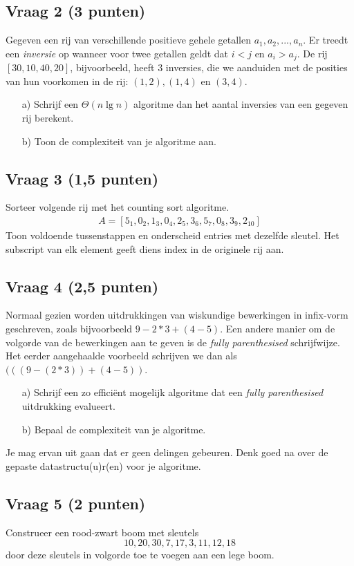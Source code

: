 \documentclass[kulak]{kulakarticle}
\begin{document}
	\subsection*{Vraag 2 (3 punten)}

	Gegeven een rij van verschillende positieve gehele getallen \(a_1, a_2, ..., a_n\). Er treedt een \textit{inversie} op wanneer voor twee getallen geldt dat \(i<j\) en \(a_i>a_j\). De rij \([30,10,40,20]\), bijvoorbeeld, heeft 3 inversies, die we aanduiden met de posities van hun voorkomen in de rij: \((1,2), (1,4)\) en \((3,4)\).

	\begin{itemize}
		\item[a)] Schrijf een \(\Theta(n \lg n)\) algoritme dan het aantal inversies van een gegeven rij berekent.
		\item[b)] Toon de complexiteit van je algoritme aan.
	\end{itemize}

	\subsection*{Vraag 3 (1,5 punten)}

	Sorteer volgende rij met het counting sort algoritme.
	\begin{align*}
		A = [5_1, 0_2, 1_3, 0_4, 2_5, 3_6, 5_7, 0_8, 3_9, 2_{10}]
	\end{align*}
	Toon voldoende tussenstappen en onderscheid entries met dezelfde sleutel. Het subscript van elk element geeft diens index in de originele rij aan.

	\subsection*{Vraag 4 (2,5 punten)}

	Normaal gezien worden uitdrukkingen van wiskundige bewerkingen in infix-vorm geschreven, zoals bijvoorbeeld  \(9-2*3+(4-5)\). Een andere manier om de volgorde van de bewerkingen aan te geven is de \textit{fully parenthesised} schrijfwijze. Het eerder aangehaalde voorbeeld schrijven we dan als \( (((9 - (2*3)) + (4 - 5)) \).

	\begin{enumerate}
		\item[a)] Schrijf een zo efficiënt mogelijk algoritme dat een \textit{fully parenthesised} uitdrukking evalueert.
		\item[b)] Bepaal de complexiteit van je algoritme.
	\end{enumerate}

	Je mag ervan uit gaan dat er geen delingen gebeuren. Denk goed na over de gepaste datastructu(u)r(en) voor je algoritme.

	\subsection*{Vraag 5 (2 punten)}

	Construeer een rood-zwart boom met sleutels \[10, 20, 30, 7, 17, 3, 11, 12, 18\] door deze sleutels in volgorde toe te voegen aan een lege boom.
\end{document}
